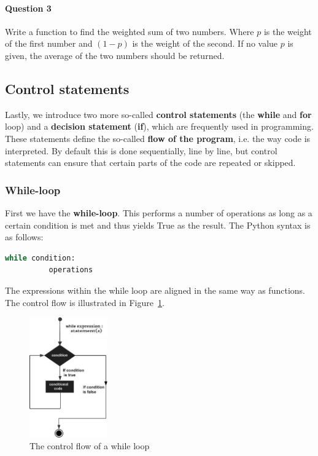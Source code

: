 \paragraph{Question 3}

Write a function to find the weighted sum of two numbers. Where $p$ is the weight of the first number and $(1-p)$ is the weight of the second. If no value $p$ is given, the average of the two numbers should be returned.


\subsection{Control statements}\label{PTSec:Control_statements}

Lastly, we introduce two more so-called \textbf{control statements} (the \textbf{while} and \textbf{for} loop) and a \textbf{decision statement} (\textbf{if}), which are frequently used in programming. These statements define the so-called \textbf{flow of the program}, i.e. the way code is interpreted. By default this is done sequentially, line by line, but control statements can ensure that certain parts of the code are repeated or skipped.

\subsubsection{While-loop}
First we have the \textbf{while-loop}. This performs a number of operations as long as a certain condition is met and thus yields True as the result. The Python syntax is as follows:

\begin{lstlisting}[language=Python]
	while condition:
	      operations
\end{lstlisting}
    
The expressions within the while loop are aligned in the same way as functions. The control flow is illustrated in Figure~\ref{fig_python_1}.

\begin{figure}[H]
	\begin{center}
		\includegraphics[width=0.3\textwidth]{fig_python_1}
		\caption{The control flow of a while loop}
		\label{fig_python_1}
	\end{center}
\end{figure}

